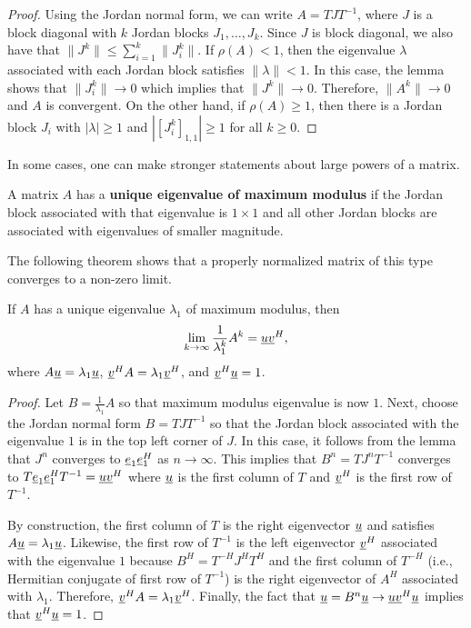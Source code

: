 \begin{proof}
Using the Jordan normal form, we can write $A = T J T^{-1}$, where $J$ is a block diagonal with $k$ Jordan blocks $J_1,\ldots,J_k$.
Since $J$ is block diagonal, we also have that $\| J^k \| \leq \sum_{i=1}^k \| J_i^k \|$.
If $\rho(A)<1$, then the eigenvalue $\lambda$ associated with each Jordan block satisfies $\| \lambda \| < 1$.
In this case, the lemma shows that $\| J_i^k \| \rightarrow 0$ which implies that $\| J^k \| \rightarrow 0$.
Therefore, $\| A^k \| \rightarrow 0$ and $A$ is convergent.
On the other hand, if $\rho(A) \geq 1$, then there is a Jordan block $J_i$ with $| \lambda | \geq 1$ and $| [ J_i^k ]_{1,1} | \geq 1$ for all $k\geq 0$.
\end{proof}

In some cases, one can make stronger statements about large powers of a matrix.

\begin{definition}
A matrix $A$ has a \textbf{unique eigenvalue of maximum modulus} if the Jordan block associated with that eigenvalue is $1\times 1$ and all other Jordan blocks are associated with eigenvalues of smaller magnitude.
\end{definition}

The following theorem shows that a properly normalized matrix of this type converges to a non-zero limit.

\begin{theorem}
If $A$ has a unique eigenvalue $\lambda_1$ of maximum modulus, then
\[ \lim_{k\rightarrow \infty} \frac{1}{\lambda_1^k} A^k = \underline{u} \underline{v}^H, \]
where $A \underline{u} = \lambda_1 \underline{u}$, $\underline{v}^H A = \lambda_1 \underline{v}^H$, and $\underline{v}^H \underline{u} = 1$.
\end{theorem}
\begin{proof}
Let $B = \frac{1}{\lambda_1} A$ so that maximum modulus eigenvalue is now $1$.
Next, choose the Jordan normal form $B = T J T^{-1}$ so that the Jordan block associated with the eigenvalue $1$ is in the top left corner of $J$.
In this case, it follows from the lemma that $J^n$ converges to $\underline{e}_1 \underline{e}_1^H$ as $n\rightarrow \infty$.
This implies that $B^n = T J^n T^{-1}$ converges to $T \underline{e}_1 \underline{e}_1^H T^{-1} = \underline{u} \underline{v}^H$ where $\underline{u}$ is the first column of $T$ and $\underline{v}^H$ is the first row of $T^{-1}$.

By construction, the first column of $T$ is the right eigenvector $\underline{u}$ and satisfies $A \underline{u} = \lambda_1 \underline{u}$.
Likewise, the first row of $T^{-1}$ is the left eigenvector $\underline{v}^H$ associated with the eigenvalue $1$ because $B^H = T^{-H} J^H T^H$ and the first column of $T^{-H}$ (i.e., Hermitian conjugate of first row of $T^{-1}$) is the right eigenvector of $A^H$ associated with $\lambda_1$.
Therefore, $\underline{v}^H A = \lambda_1 \underline{v}^H$.
Finally, the fact that $\underline{u} = B^n \underline{u} \rightarrow \underline{u} \underline{v}^H \underline{u}$ implies that $\underline{v}^H \underline{u} = 1$.
\end{proof}




